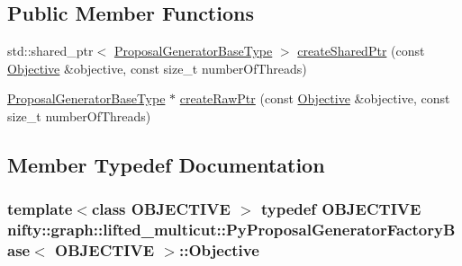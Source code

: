 \subsection*{Public Member Functions}
\begin{DoxyCompactItemize}
\item 
std\+::shared\+\_\+ptr$<$ \hyperlink{classnifty_1_1graph_1_1lifted__multicut_1_1ProposalGeneratorFactoryBase_a26c563a0dc26559eca515d98ddbc0e8b}{Proposal\+Generator\+Base\+Type} $>$ \hyperlink{classnifty_1_1graph_1_1lifted__multicut_1_1PyProposalGeneratorFactoryBase_a1812272967ca9b59d79b1bf5d4f5d1d6}{create\+Shared\+Ptr} (const \hyperlink{classnifty_1_1graph_1_1lifted__multicut_1_1PyProposalGeneratorFactoryBase_a17a243ad822d48f623cd9b22ccce0736}{Objective} \&objective, const size\+\_\+t number\+Of\+Threads)
\item 
\hyperlink{classnifty_1_1graph_1_1lifted__multicut_1_1ProposalGeneratorFactoryBase_a26c563a0dc26559eca515d98ddbc0e8b}{Proposal\+Generator\+Base\+Type} $\ast$ \hyperlink{classnifty_1_1graph_1_1lifted__multicut_1_1PyProposalGeneratorFactoryBase_ad5ae8eb8739a12196e4e89894eb4c41b}{create\+Raw\+Ptr} (const \hyperlink{classnifty_1_1graph_1_1lifted__multicut_1_1PyProposalGeneratorFactoryBase_a17a243ad822d48f623cd9b22ccce0736}{Objective} \&objective, const size\+\_\+t number\+Of\+Threads)
\end{DoxyCompactItemize}


\subsection{Member Typedef Documentation}
\hypertarget{classnifty_1_1graph_1_1lifted__multicut_1_1PyProposalGeneratorFactoryBase_a17a243ad822d48f623cd9b22ccce0736}{}
\subsubsection[{Objective}]{\setlength{\rightskip}{0pt plus 5cm}template$<$class O\+B\+J\+E\+C\+T\+I\+V\+E $>$ typedef O\+B\+J\+E\+C\+T\+I\+V\+E {\bf nifty\+::graph\+::lifted\+\_\+multicut\+::\+Py\+Proposal\+Generator\+Factory\+Base}$<$ O\+B\+J\+E\+C\+T\+I\+V\+E $>$\+::{\bf Objective}}\label{classnifty_1_1graph_1_1lifted__multicut_1_1PyProposalGeneratorFactoryBase_a17a243ad822d48f623cd9b22ccce0736}
\hypertarget{classnifty_1_1graph_1_1lifted__multicut_1_1PyProposalGeneratorFactoryBase_af73e8b46f7e053e667e3c78e57b958b1}{}
